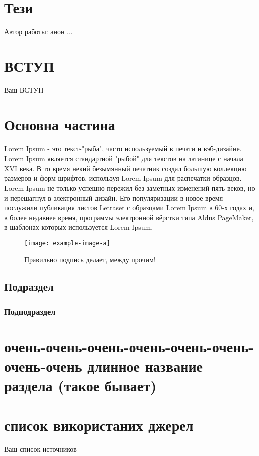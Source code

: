 \documentclass[a4paper, 14pt]{article}
\let\stdsection\section
\renewcommand\section{\newpage\stdsection}
\begin{document}
\section*{Т\lowercase{ези}}
Автор работы: анон
...
\newpage

\renewcommand{\contentsname}{\normalsize \hspace{1.25em} \normalfont ЗМІСТ} %

\tableofcontents %

\newpage
{} %
\section*{\textbf{ВСТУП}}
Ваш ВСТУП
\newpage %
\section{Основна частина}
Lorem Ipsum - это текст-"рыба", часто используемый в печати и вэб-дизайне. Lorem Ipsum является стандартной "рыбой" для текстов на латинице с начала XVI века. В то время некий безымянный печатник создал большую коллекцию размеров и форм шрифтов, используя Lorem Ipsum для распечатки образцов. Lorem Ipsum не только успешно пережил без заметных изменений пять веков, но и перешагнул в электронный дизайн. Его популяризации в новое время послужили публикация листов Letraset с образцами Lorem Ipsum в 60-х годах и, в более недавнее время, программы электронной вёрстки типа Aldus PageMaker, в шаблонах которых используется Lorem Ipsum.
\begin{figure}[h]
    \centering
    \texttt{[image: example-image-a]}
    \caption{Правильно подпись делает, между прочим!}
    \label{fig:mesh1}
\end{figure}
 
\subsection{Подраздел}
\subsubsection{Подподраздел}
\section{очень-очень-очень-очень-очень-очень-очень-очень длинное название раздела (такое бывает)}
\section*{список використаних джерел}
Ваш список источников
\end{document}
